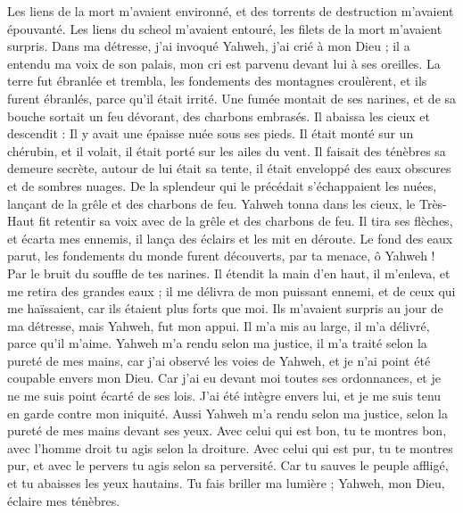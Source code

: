 \begin{multicols}{2}
Les liens de la mort m'avaient environné, et des torrents de destruction m'avaient épouvanté.
Les liens du scheol m'avaient entouré, les filets de la mort m'avaient surpris.
Dans ma détresse, j'ai invoqué Yahweh, j'ai crié à mon Dieu ; il a entendu ma voix de son palais, mon cri est parvenu devant lui à ses oreilles.
La terre fut ébranlée et trembla, les fondements des montagnes croulèrent, et ils furent ébranlés, parce qu'il était irrité.
Une fumée montait de ses narines, et de sa bouche sortait un feu dévorant, des charbons embrasés.
Il abaissa les cieux et descendit : Il y avait une épaisse nuée sous ses pieds.
Il était monté sur un chérubin, et il volait, il était porté sur les ailes du vent.
Il faisait des ténèbres sa demeure secrète, autour de lui était sa tente, il était enveloppé des eaux obscures et de sombres nuages.
De la splendeur qui le précédait s’échappaient les nuées, lançant de la grêle et des charbons de feu.
Yahweh tonna dans les cieux, le Très-Haut fit retentir sa voix avec de la grêle et des charbons de feu.
Il tira ses flèches, et écarta mes ennemis, il lança des éclairs et les mit en déroute.
Le fond des eaux parut, les fondements du monde furent découverts, par ta menace, ô Yahweh ! Par le bruit du souffle de tes narines.
Il étendit la main d'en haut, il m'enleva, et me retira des grandes eaux ;
il me délivra de mon puissant ennemi, et de ceux qui me haïssaient, car ils étaient plus forts que moi.
Ils m'avaient surpris au jour de ma détresse, mais Yahweh, fut mon appui.
Il m'a mis au large, il m'a délivré, parce qu'il m’aime.
Yahweh m'a rendu selon ma justice, il m'a traité selon la pureté de mes mains,
car j’ai observé les voies de Yahweh, et je n’ai point été coupable envers mon Dieu.
Car j'ai eu devant moi toutes ses ordonnances, et je ne me suis point écarté de ses lois.
J'ai été intègre envers lui, et je me suis tenu en garde contre mon iniquité.
Aussi Yahweh m'a rendu selon ma justice, selon la pureté de mes mains devant ses yeux.
Avec celui qui est bon, tu te montres bon, avec l'homme droit tu agis selon la droiture.
Avec celui qui est pur, tu te montres pur, et avec le pervers tu agis selon sa perversité.
Car tu sauves le peuple affligé, et tu abaisses les yeux hautains.
Tu fais briller ma lumière ; Yahweh, mon Dieu, éclaire mes ténèbres.

\end{multicols}
